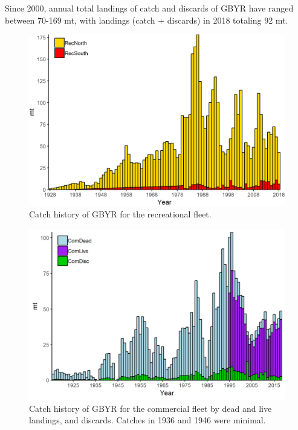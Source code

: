 \documentclass[12pt,]{article}
\begin{document}
Since 2000, annual total landings of catch and discards of GBYR have
ranged between 70-169 mt, with landings (catch + discards) in 2018
totaling 92 mt.

\FloatBarrier

\begin{figure}
\centering
\includegraphics{Figures/rec_exec.png}
\caption{Catch history of GBYR for the recreational fleet.
\label{fig:Exec_catch1}}
\end{figure}

\begin{figure}
\centering
\includegraphics{Figures/comm_exec.png}
\caption{Catch history of GBYR for the commercial fleet by dead and live
landings, and discards. Catches in 1936 and 1946 were minimal.
\label{fig:Exec_catch2}}
\end{figure}

\FloatBarrier
\end{document}
